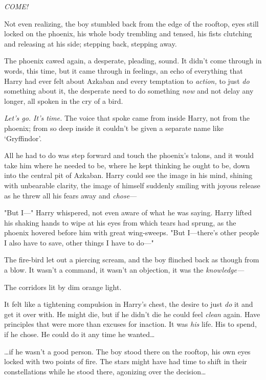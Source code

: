 \emph{COME!}

Not even realizing, the boy stumbled back from the edge of the rooftop, eyes 
still locked on the phoenix, his whole body trembling and tensed, his fists 
clutching and releasing at his side; stepping back, stepping away.

The phoenix cawed again, a desperate, pleading, sound. It didn't come through 
in words, this time, but it came through in feelings, an echo of everything 
that Harry had ever felt about Azkaban and every temptation to \emph{action,} 
to just \emph{do} something about it, the desperate need to do something 
\emph{now} and not delay any longer, all spoken in the cry of a bird.

\emph{Let's go. It's time.} The voice that spoke came from inside Harry, not 
from the phoenix; from so deep inside it couldn't be given a separate name like 
`Gryffindor'.

All he had to do was step forward and touch the phoenix's talons, and it would 
take him where he needed to be, where he kept thinking he ought to be, down 
into the central pit of Azkaban. Harry could see the image in his mind, shining 
with unbearable clarity, the image of himself suddenly smiling with joyous 
release as he threw all his fears away and \emph{chose}---

"But I---" Harry whispered, not even aware of what he was saying. Harry lifted 
his shaking hands to wipe at his eyes from which tears had sprung, as the 
phoenix hovered before him with great wing-sweeps. "But I---there's other 
people I also have to save, other things I have to do---"

The fire-bird let out a piercing scream, and the boy flinched back as though 
from a blow. It wasn't a command, it wasn't an objection, it was the 
\emph{knowledge---}

The corridors lit by dim orange light.

It felt like a tightening compulsion in Harry's chest, the desire to just 
\emph{do} it and get it over with. He might die, but if he didn't die he could 
feel \emph{clean} again. Have principles that were more than excuses for 
inaction. It was \emph{his} life. His to spend, if he chose. He could do it any 
time he wanted{\ldots}

{\ldots}if he wasn't a good person.
\sbreak
The boy stood there on the rooftop, his own eyes locked with two points of 
fire. The stars might have had time to shift in their constellations while he 
stood there, agonizing over the decision{\ldots}

